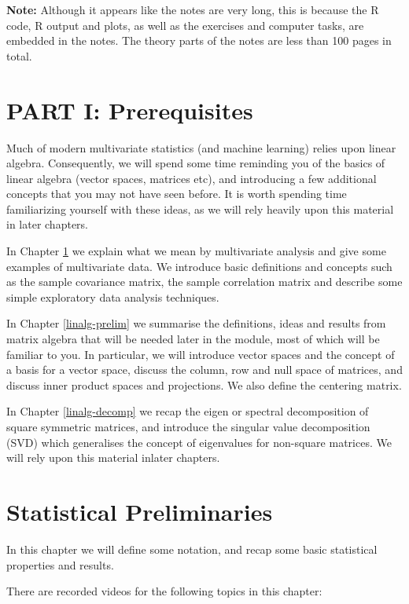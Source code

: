 \documentclass[
]{book}
\theoremstyle{definition}
\theoremstyle{definition}
\theoremstyle{definition}
\theoremstyle{definition}
\theoremstyle{remark}
\begin{document}
\textbf{Note:} Although it appears like the notes are very long, this is because the R code, R output and plots, as well as the exercises and computer tasks, are embedded in the notes. The theory parts of the notes are less than 100 pages in total.

\chapter*{PART I: Prerequisites}\label{part-i-prerequisites}

Much of modern multivariate statistics (and machine learning) relies upon linear algebra. Consequently, we will spend some time reminding you of the basics of linear algebra (vector spaces, matrices etc), and introducing a few additional concepts that you may not have seen before. It is worth spending time familiarizing yourself with these ideas, as we will rely heavily upon this material in later chapters.

In Chapter \ref{stat-prelim} we explain what we mean by multivariate analysis and give some examples of multivariate data. We introduce basic definitions and concepts such as the sample covariance matrix, the sample correlation matrix and describe some simple exploratory data analysis techniques.

In Chapter \ref{linalg-prelim} we summarise the definitions, ideas and results from matrix algebra that will be needed later in the module, most of which will be familiar to you. In particular, we will introduce vector spaces and the concept of a basis for a vector space, discuss the column, row and null space of matrices, and discuss inner product spaces and projections. We also define the centering matrix.

In Chapter \ref{linalg-decomp} we recap the eigen or spectral decomposition of square symmetric matrices, and introduce the singular value decomposition (SVD) which generalises the concept of eigenvalues for non-square matrices. We will rely upon this material inlater chapters.

\chapter{Statistical Preliminaries}\label{stat-prelim}

In this chapter we will define some notation, and recap some basic statistical properties and results.

There are recorded videos for the following topics in this chapter:
\end{document}
